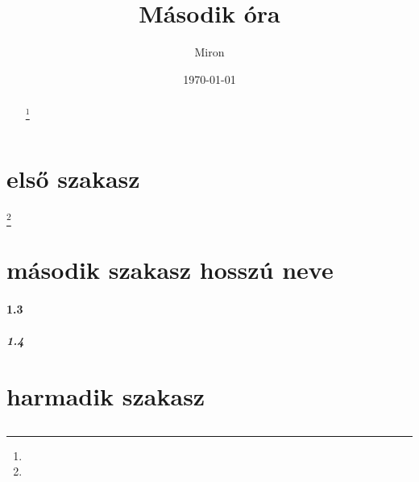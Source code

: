 \documentclass[twoside,12pt]{article}
\title{Második óra}
\author{Miron}
\date{\today}
\begin{document}
\pagestyle{fancy}
\fancyhead[LE,RO]{\thepage}
\renewcommand{\footrulewidth}{0.4pt}




\maketitle

\begin{abstract}
\hulipsum[1]

\hulipsum[2]
\footnote{}
\end{abstract}

\tableofcontents
{}
\pagebreak




\section{első szakasz}
\footnote{}
\subsection{}
\hulipsum[1]



\subsection{}
\hulipsum[1]

\vspace{8cm}
\section[masodik szakasz]{második szakasz hosszú neve}

\paragraph{1.3}
\hulipsum[1]
\subparagraph{1.4}
\hulipsum[1]


\appendix
\section{harmadik szakasz}
\subsection{}
\subsection{}
\end{document}
